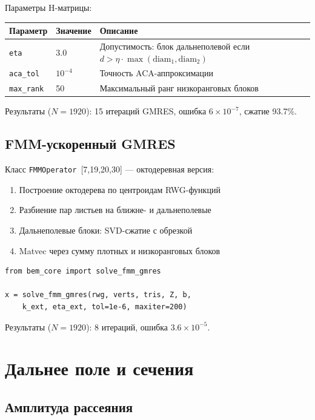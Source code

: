 \documentclass[12pt,a4paper]{article}
\begin{document}
Параметры H-матрицы:
\begin{center}
\begin{tabular}{llp{6cm}}
\toprule
Параметр & Значение & Описание \\
\midrule
\texttt{eta} & 3.0 & Допустимость: блок дальнеполевой если $d > \eta \cdot \max(\mathrm{diam}_1, \mathrm{diam}_2)$ \\
\texttt{aca\_tol} & $10^{-4}$ & Точность ACA-аппроксимации \\
\texttt{max\_rank} & 50 & Максимальный ранг низкоранговых блоков \\
\bottomrule
\end{tabular}
\end{center}

Результаты ($N = 1920$): 15 итераций GMRES, ошибка $6 \times 10^{-7}$, сжатие 93.7\%.

\subsection{FMM-ускоренный GMRES}

Класс \texttt{FMMOperator}~[7,19,20,30] --- октодеревная версия:
\begin{enumerate}
  \item Построение октодерева по центроидам RWG-функций
  \item Разбиение пар листьев на ближне- и дальнеполевые
  \item Дальнеполевые блоки: SVD-сжатие с обрезкой
  \item Matvec через сумму плотных и низкоранговых блоков
\end{enumerate}

\begin{lstlisting}
from bem_core import solve_fmm_gmres

x = solve_fmm_gmres(rwg, verts, tris, Z, b,
    k_ext, eta_ext, tol=1e-6, maxiter=200)
\end{lstlisting}

Результаты ($N = 1920$): 8 итераций, ошибка $3.6 \times 10^{-5}$.


\section{Дальнее поле и сечения}

\subsection{Амплитуда рассеяния}
\end{document}
